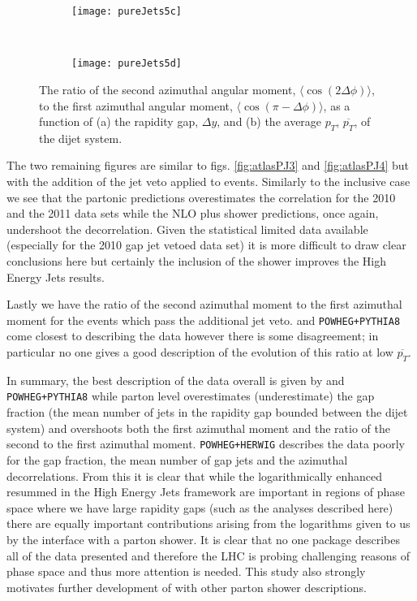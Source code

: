 	\begin{figure}[bth]
		\begin{subfigure}[b]{0.48\textwidth}
			\texttt{[image: pureJets5c]}
			\caption{}
			\label{fig:}
		\end{subfigure}
		~
		\begin{subfigure}[b]{0.48\textwidth}
			\texttt{[image: pureJets5d]}
			\caption{}
			\label{fig:}
		\end{subfigure}
		\caption{The ratio of the second azimuthal angular moment, $\langle \cos(2\Delta\phi)\rangle$,
		to the first azimuthal angular moment, $\langle \cos(\pi-\Delta\phi)\rangle$, as a function of
		(a) the rapidity gap, $\Delta y$, and (b) the average $p_T$, $\overline{p_T}$, of the dijet system.}
		\label{fig:atlasPJ4}
	\end{figure}

	The two remaining figures are similar to figs. \eqref{fig:atlasPJ3} and \eqref{fig:atlasPJ4} but
	with the addition of the jet veto applied to events.  Similarly to the inclusive case we see that the partonic \HEJ
	predictions overestimates the correlation for the 2010 and the 2011 data sets while the NLO plus
	shower predictions, once again, undershoot the decorrelation.  Given the statistical limited
	data available (especially for the 2010 gap jet vetoed data set) it is more difficult to draw
	clear conclusions here but certainly the inclusion of the \ARIADNE shower improves the High
	Energy Jets results.

	Lastly we have the ratio of the second azimuthal moment to the first azimuthal moment for the
	events which pass the additional jet veto.  \HEJA and \texttt{POWHEG+PYTHIA8} come closest
	to describing the data however there is some disagreement; in particular no one gives a good
	description of the evolution of this ratio at low $\overline{p_T}$.

	In summary, the best description of the data overall is given by \HEJA and \texttt{POWHEG+PYTHIA8}
	while parton level \HEJ overestimates (underestimate) the gap fraction (the mean number of jets
	in the rapidity gap bounded between the dijet system) and overshoots both the first azimuthal
	moment and the ratio of the second to the first azimuthal moment.  \texttt{POWHEG+HERWIG} describes
	the data poorly for the gap fraction, the mean number of gap jets and the azimuthal decorrelations.
	From this it is clear that while the logarithmically enhanced resummed in the High Energy Jets
	framework are important in regions of phase space where we have large rapidity gaps (such as the
	analyses described here) there are equally important contributions arising from the logarithms
	given to us by the interface with a parton shower.  It is clear that no one package describes all
	of the data presented and therefore the LHC is probing challenging reasons of phase space and thus
	more attention is needed.  This study also strongly motivates further development of \hej with
	other parton shower descriptions.

